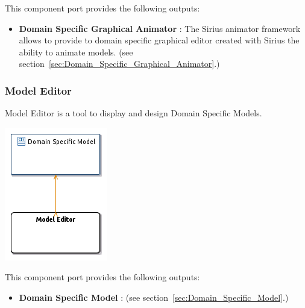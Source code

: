 \documentclass{gemoc} %
\begin{document}
This component port provides the following outputs:
\begin{itemize}
  \item \textbf{Domain Specific Graphical Animator} :
The Sirius animator framework allows to provide to domain specific graphical editor created with Sirius the ability to animate models.
(see section~\ref{sec:Domain_Specific_Graphical_Animator}.)
\end{itemize}




\subsubsection{Model Editor}
\label{sec:Model_Editor}
Model Editor is a tool to display and design Domain Specific Models.
\begin{center}
\includegraphics*[trim=0.0cm 0.0cm 0cm 0.0cm, clip=true]{../images/generated/Generated_Model_Editor.png}
\end{center}


This component port provides the following outputs:
\begin{itemize}
  \item \textbf{Domain Specific Model} :
(see section~\ref{sec:Domain_Specific_Model}.)
\end{itemize}
\end{document}
